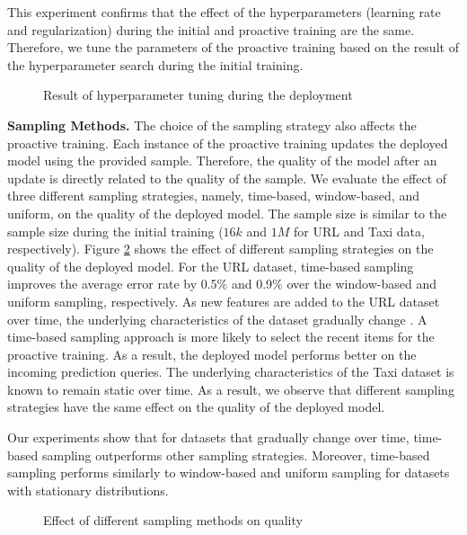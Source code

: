 This experiment confirms that the effect of the hyperparameters (learning rate and regularization) during the initial and proactive training are the same.
Therefore, we tune the parameters of the proactive training based on the result of the hyperparameter search during the initial training.
\begin{figure}[!h]
\centering
\resizebox{\columnwidth}{!}{}
\caption{Result of hyperparameter tuning during the deployment}
\label{hyper-param-figure}
\end{figure}

\textbf{Sampling Methods.}
The choice of the sampling strategy also affects the proactive training.
Each instance of the proactive training updates the deployed model using the provided sample.
Therefore, the quality of the model after an update is directly related to the quality of the sample.
We evaluate the effect of three different sampling strategies, namely, time-based, window-based, and uniform, on the quality of the deployed model.
The sample size is similar to the sample size during the initial training ($16k$ and $1M$ for URL and Taxi data, respectively).
Figure \ref{sampling-method-figure} shows the effect of different sampling strategies on the quality of the deployed model.
For the URL dataset, time-based sampling improves the average error rate by 0.5\% and 0.9\% over the window-based and uniform sampling, respectively.
As new features are added to the URL dataset over time, the underlying characteristics of the dataset gradually change \cite{ma2009identifying}.
A time-based sampling approach is more likely to select the recent items for the proactive training.
As a result, the deployed model performs better on the incoming prediction queries.
The underlying characteristics of the Taxi dataset is known to remain static over time.
As a result, we observe that different sampling strategies have the same effect on the quality of the deployed model.

Our experiments show that for datasets that gradually change over time, time-based sampling outperforms other sampling strategies.
Moreover, time-based sampling performs similarly to window-based and uniform sampling for datasets with stationary distributions.

\begin{figure}[!h]
\centering
\resizebox{\columnwidth}{!}{}
\caption{Effect of different sampling methods on quality}
\label{sampling-method-figure}
\end{figure}

